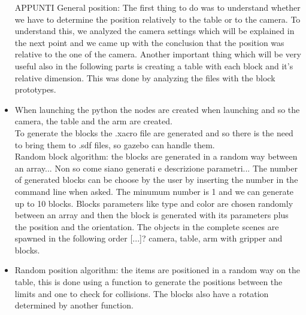 \documentclass[12pt,a4paper]{article}
\begin{document}
\begin{itemize}
    \item [APPUNTI] General position: The first thing to do was to understand whether we have to determine the position relatively to the table or to the camera. To understand this, we analyzed the camera settings which will be explained in the next point and we came up with the conclusion that the position was relative to the one of the camera.
    Another important thing which will be very useful also in the following parts is creating a table with each block and it's relative dimension. This was done by analyzing the files with the block prototypes.
    \item When launching the python the nodes are created when launching and so the camera, the table and the arm are created.\\
    To generate the blocks the .xacro file are generated and so there is the need to bring them to .sdf files, so gazebo can handle them.\\
    Random block algorithm: the blocks are generated in a random way between an array... Non so come siano generati e descrizione parametri...
    The number of generated blocks can be choose by the user by inserting the number in the command line when asked. The minumum number is 1 and we can generate up to 10 blocks. Blocks parameters like type and color are chosen randomly between an array and then the block is generated with its parameters plus the position and the orientation.
    The objects in the complete scenes are spawned in the following order [...]? camera, table, arm with gripper and blocks.
    \item Random position algorithm: the items are positioned in a random way on the table, this is done using a function to generate the positions between the limits and one to check for collisions. The blocks also have a rotation determined by another function.
\end{itemize}
\end{document}
